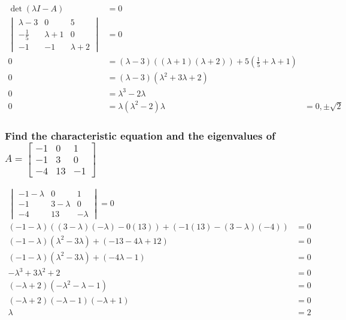 \documentclass[
  letterpaper,
  DIV=11,
  numbers=noendperiod]{scrartcl}
\begin{document}
\begin{align*}
\det(\lambda I - A) &= 0 \\
\begin{vmatrix}\lambda-3 & 0 & 5 \\ -\frac{1}{5} & \lambda+1 & 0 \\ -1 & -1 & \lambda+2 \end{vmatrix} &= 0 \\
0 &= (\lambda-3)((\lambda+1)(\lambda+2))+5(\frac{1}{5} + \lambda+1) \\
0 &= (\lambda-3)(\lambda^2+3\lambda+2) \\
0 &= \lambda^3-2\lambda \\
0 &= \lambda(\lambda^2-2)
\lambda &= 0, \pm\sqrt{2}
\end{align*}

\hypertarget{find-the-characteristic-equation-and-the-eigenvalues-of-a-beginbmatrix-1-0-1--1-3-0--4-13--1-endbmatrix}{%
\subsubsection{\texorpdfstring{Find the characteristic equation and the
eigenvalues of
\(A = \begin{bmatrix}-1 & 0 & 1 \\ -1 & 3 & 0 \\ -4 & 13 & -1 \end{bmatrix}\)}{Find the characteristic equation and the eigenvalues of A = \textbackslash begin\{bmatrix\}-1 \& 0 \& 1 \textbackslash\textbackslash{} -1 \& 3 \& 0 \textbackslash\textbackslash{} -4 \& 13 \& -1 \textbackslash end\{bmatrix\}}}\label{find-the-characteristic-equation-and-the-eigenvalues-of-a-beginbmatrix-1-0-1--1-3-0--4-13--1-endbmatrix}}

\begin{align*}
\begin{vmatrix}-1-\lambda & 0 & 1 \\ -1 & 3-\lambda & 0 \\ -4 & 13 & -\lambda \end{vmatrix} = 0 \\
(-1-\lambda) \left((3-\lambda)(-\lambda)-0(13)\right)+\left(-1(13)-(3-\lambda)(-4)\right) &= 0 \\
(-1-\lambda)(\lambda^2-3\lambda)+(-13-4\lambda+12) &= 0 \\
(-1-\lambda)(\lambda^2-3\lambda)+(-4\lambda-1) &= 0 \\
-\lambda^3+3\lambda^2+2 &= 0 \\
(-\lambda+2)(-\lambda^2-\lambda-1) &= 0 \\
(-\lambda+2)(-\lambda-1)(-\lambda+1) &= 0 \\
\lambda &= 2
\end{align*}
\end{document}
